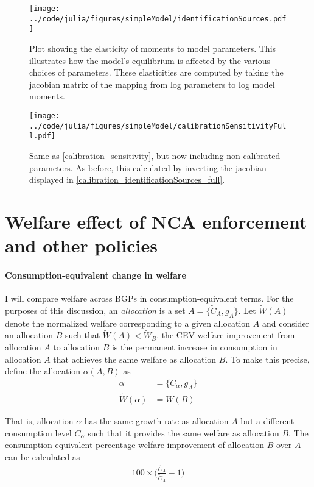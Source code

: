 \documentclass[11pt,english]{article}
\begin{document}
\begin{figure}[]
	\texttt{[image: ../code/julia/figures/simpleModel/identificationSources.pdf]}
	\caption{Plot showing the elasticity of moments to model parameters. This illustrates how the model's equilibrium is affected by the various choices of parameters. These elasticities are computed by taking the jacobian matrix of the mapping from log parameters to log model moments.}
	\label{calibration_identificationSources}
\end{figure}

\begin{figure}[]
	\texttt{[image: ../code/julia/figures/simpleModel/calibrationSensitivityFull.pdf]}
	\caption{Same as \autoref{calibration_sensitivity}, but now including non-calibrated parameters. As before, this calculated by inverting the jacobian displayed in \autoref{calibration_identificationSources_full}.}
	\label{calibration_sensitivity_full}
\end{figure}

\section{Welfare effect of NCA enforcement and other policies}\label{sec:policy_analysis}

\paragraph{Consumption-equivalent change in welfare} 

I will compare welfare across BGPs in consumption-equivalent terms. For the purposes of this discussion, an \textit{allocation} is a set $A = \{ \tilde{C}_A, g_A \}$. Let $\tilde{W}(A)$ denote the normalized welfare corresponding to a given allocation $A$ and consider an allocation $B$ such that $\tilde{W}(A) < \tilde{W}_B$. the CEV welfare improvement from allocation $A$ to allocation $B$ is the permanent increase in consumption in allocation $A$ that achieves the same welfare as allocation $B$. To make this precise, define the allocation $\alpha(A,B)$ as
\begin{align}
\alpha &= \{C_{\alpha}, g_A\} \\
\tilde{W} ( \alpha ) &= \tilde{W} ( B ) 
\end{align}

That is, allocation $\alpha$ has the same growth rate as allocation $A$ but a different consumption level $C_{\alpha}$ such that it provides the same welfare as allocation $B$. The consumption-equivalent percentage welfare improvement of allocation $B$ over $A$ can be calculated as
\begin{align}
100 \times \big(\frac{\hat{C}_A}{\tilde{C}_A} - 1 \big) 
\end{align}
\end{document}
